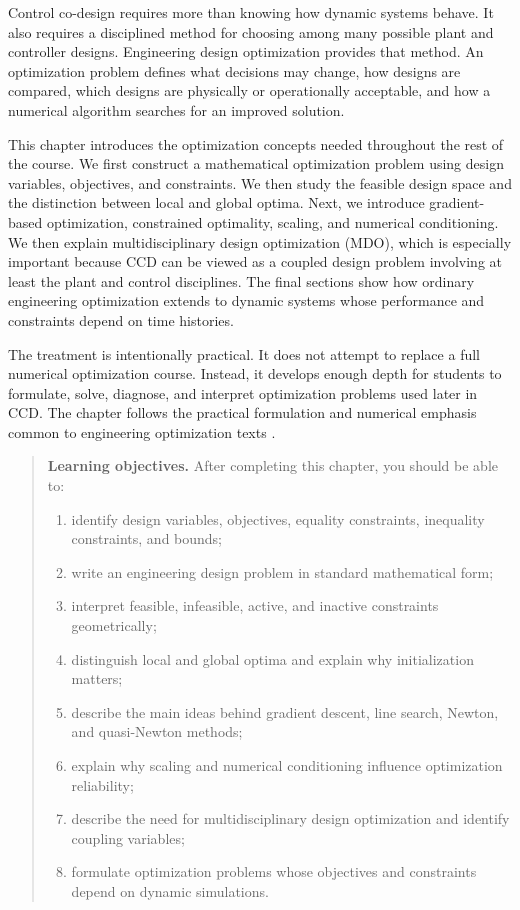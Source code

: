 \documentclass[11pt]{article}
\newenvironment{learningobjectives}{%
\begin{quote}\color{black}\textbf{Learning objectives.} After completing this chapter, you should be able to:
\begin{enumerate}[leftmargin=1.4em,itemsep=0.35em,topsep=0.5em]
}{\end{enumerate}\end{quote}}
\begin{document}
Control co-design requires more than knowing how dynamic systems behave. It also requires a disciplined method for choosing among many possible plant and controller designs. Engineering design optimization provides that method. An optimization problem defines what decisions may change, how designs are compared, which designs are physically or operationally acceptable, and how a numerical algorithm searches for an improved solution.

This chapter introduces the optimization concepts needed throughout the rest of the course. We first construct a mathematical optimization problem using design variables, objectives, and constraints. We then study the feasible design space and the distinction between local and global optima. Next, we introduce gradient-based optimization, constrained optimality, scaling, and numerical conditioning. We then explain multidisciplinary design optimization (MDO), which is especially important because CCD can be viewed as a coupled design problem involving at least the plant and control disciplines. The final sections show how ordinary engineering optimization extends to dynamic systems whose performance and constraints depend on time histories.

The treatment is intentionally practical. It does not attempt to replace a full numerical optimization course. Instead, it develops enough depth for students to formulate, solve, diagnose, and interpret optimization problems used later in CCD. The chapter follows the practical formulation and numerical emphasis common to engineering optimization texts \cite{martinsning,allisonbook}.

\begin{learningobjectives}
  \item identify design variables, objectives, equality constraints, inequality constraints, and bounds;
  \item write an engineering design problem in standard mathematical form;
  \item interpret feasible, infeasible, active, and inactive constraints geometrically;
  \item distinguish local and global optima and explain why initialization matters;
  \item describe the main ideas behind gradient descent, line search, Newton, and quasi-Newton methods;
  \item explain why scaling and numerical conditioning influence optimization reliability;
  \item describe the need for multidisciplinary design optimization and identify coupling variables;
  \item formulate optimization problems whose objectives and constraints depend on dynamic simulations.
\end{learningobjectives}
\end{document}
